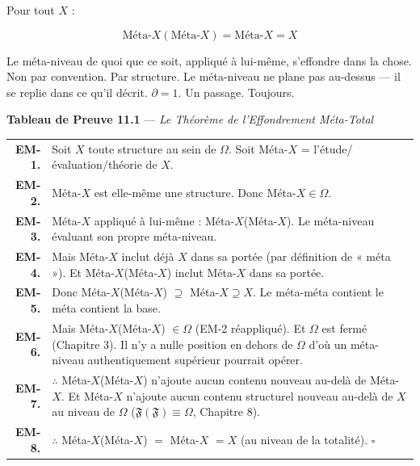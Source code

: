 \documentclass[10pt, openany, oneside]{book}
\renewcommand{\footnotesize}{\fontsize{8.5}{11}\selectfont}
\begin{document}
\vspace{2em}


\noindent Pour tout $X$ :

$$\text{Méta-}X(\text{Méta-}X) = \text{Méta-}X = X$$

Le méta-niveau de quoi que ce soit, appliqué à lui-même, s'effondre dans la chose. Non par convention. Par structure. Le méta-niveau ne plane pas au-dessus --- il se replie dans ce qu'il décrit. $\partial = 1$. Un passage. Toujours.

\vspace{0.5em}

\textbf{Tableau de Preuve 11.1} --- \textit{Le Théorème de l'Effondrement Méta-Total}

\vspace{0.5em}

{\footnotesize
\noindent\begin{tabular}{r p{}}
\textbf{EM-1.} & Soit $X$ toute structure au sein de $\Omega$. Soit Méta-$X$ = l'étude/évaluation/théorie de $X$. \\[0.3em]
\textbf{EM-2.} & Méta-$X$ est elle-même une structure. Donc Méta-$X \in \Omega$. \\[0.3em]
\textbf{EM-3.} & Méta-$X$ appliqué à lui-même : Méta-$X$(Méta-$X$). Le méta-niveau évaluant son propre méta-niveau. \\[0.3em]
\textbf{EM-4.} & Mais Méta-$X$ inclut déjà $X$ dans sa portée (par définition de « méta »). Et Méta-$X$(Méta-$X$) inclut Méta-$X$ dans sa portée. \\[0.3em]
\textbf{EM-5.} & Donc Méta-$X$(Méta-$X$) $\supseteq$ Méta-$X \supseteq X$. Le méta-méta contient le méta contient la base. \\[0.3em]
\textbf{EM-6.} & Mais Méta-$X$(Méta-$X$) $\in \Omega$ (EM-2 réappliqué). Et $\Omega$ est fermé (Chapitre 3). Il n'y a nulle position en dehors de $\Omega$ d'où un méta-niveau authentiquement supérieur pourrait opérer. \\[0.3em]
\textbf{EM-7.} & $\therefore$ Méta-$X$(Méta-$X$) n'ajoute aucun contenu nouveau au-delà de Méta-$X$. Et Méta-$X$ n'ajoute aucun contenu structurel nouveau au-delà de $X$ au niveau de $\Omega$ ($\mathfrak{F}(\mathfrak{F}) \equiv \Omega$, Chapitre 8). \\[0.3em]
\textbf{EM-8.} & $\therefore$ Méta-$X$(Méta-$X$) $=$ Méta-$X$ $= X$ (au niveau de la totalité). $\square$ \\[0.3em]
\end{tabular}
}
\end{document}
